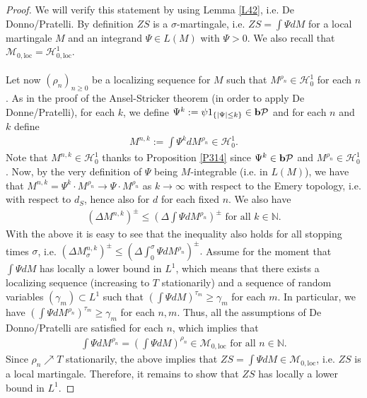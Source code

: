\documentclass[12pt,a4paper, twoside]{article}
\theoremstyle{definition}
\newcommand{\pred}{\textbf{\text{b}}\mathcal{P}}
\begin{document}
\begin{proof}
We will verify this statement by using Lemma \ref{L42}, i.e. De Donno/Pratelli. By definition $ZS$ is a $\sigma$-martingale, i.e. $ZS= \int \Psi dM$ for a local martingale $M$ and an integrand $\Psi \in L(M)$ with $\Psi >0$. We also recall that $\mathcal{M}_{0, \text{loc}} = \mathcal{H}_{0, \text{loc}}^1$. 
\\\\
Let now $( \rho_n)_{n \geq 0}$ be a localizing sequence for $M$ such that $M^{\rho_n} \in \mathcal{H}_0^1$ for each $n$. As in the proof of the Ansel-Stricker theorem (in order to apply De Donne/Pratelli), for each $k$, we define $\Psi^k := \psi 1_{\{ | \Psi| \leq k\}} \in \pred$ and for each $n$ and $k$ define 
\begin{align*}
M^{n,k} := \int \Psi^k dM^{\rho_n} \in \mathcal{H}_0^1.
\end{align*}
Note that $M^{n,k} \in \mathcal{H}_0^1$ thanks to Proposition \ref{P314} since $\Psi^k \in \pred$ and $M^{\rho_n} \in \mathcal{H}_0^1$. Now, by the very definition of $\Psi$ being $M$-integrable (i.e. in $L(M)$), we have that $M^{n,k}= \Psi^k \cdot M^{\rho_n} \to \Psi \cdot M^{\rho_n}$ as $k \to \infty$ with respect to the Emery topology, i.e. with respect to $d_S$, hence also for $d$ for each fixed $n$. We also have
\begin{align*}
( \Delta M^{n,k})^\pm \leq \left( \Delta \int \Psi dM^{\rho_n} \right)^\pm \text{ for all } k \in \mathbb{N}.
\end{align*}
With the above it is easy to see that the inequality also holds for all stopping times $\sigma$, i.e. $( \Delta M_\sigma^{n,k})^\pm \leq ( \Delta \int_0^\sigma \Psi dM^{\rho_n})^\pm.$ Assume for the moment that $\int \Psi dM$ has locally a lower bound in $L^1$, which means that there exists a localizing sequence (increasing to $T$ stationarily) and a sequence of random variables $( \gamma_m) \subset L^1$ such that $( \int \Psi dM)^{\tau_m} \geq \gamma_m$ for each $m$. In particular, we have $( \int \Psi dM^{\rho_n})^{\tau_m} \geq \gamma_m$ for each $n,m$. Thus, all the assumptions of De Donno/Pratelli are satisfied for each $n$, which implies that
\begin{align*}
\int \Psi dM^{\rho_n} = \left( \int \Psi dM \right)^{\rho_n} \in \mathcal{M}_{0, \text{loc}} \text{ for all } n \in \mathbb{N}.
\end{align*}
Since $\rho_n \nearrow T$ stationarily, the above implies that $ZS= \int \Psi dM \in \mathcal{M}_{0,  \text{loc}}$, i.e. $ZS$ is a local martingale.  Therefore,  it remains to show that $ZS$ has locally a lower bound in $L^1$. 

\end{proof}
\end{document}
